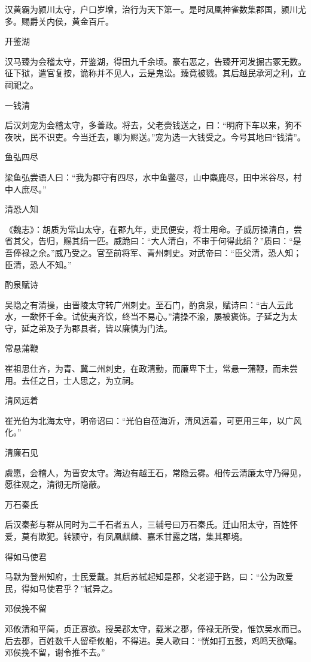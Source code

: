 \documentclass[a4paper,12pt,UTF8,twoside]{ctexbook}
\begin{document}
    汉黄霸为颍川太守，户口岁增，治行为天下第一。是时凤凰神雀数集郡国，颍川尤多。赐爵关内侯，黄金百斤。
    
    开鉴湖
    
    汉马臻为会稽太守，开鉴湖，得田九千余顷。豪右恶之，告臻开河发掘古冢无数。征下狱，遣官复按，诡称并不见人，云是鬼讼。臻竟被戮。其后越民承河之利，立祠祀之。
    
    一钱清
    
    后汉刘宠为会稽太守，多善政。将去，父老赍钱送之，曰：“明府下车以来，狗不夜吠，民不识吏。今当迁去，聊为赆送。”宠为选一大钱受之。今号其地曰“钱清”。
    
    鱼弘四尽
    
    梁鱼弘尝语人曰：“我为郡守有四尽，水中鱼鳖尽，山中麋鹿尽，田中米谷尽，村中人庶尽。”
    
    清恐人知
    
    《魏志》：胡质为常山太守，在郡九年，吏民便安，将士用命。子威厉操清白，尝省其父，告归，赐其绢一匹。威跪曰：“大人清白，不审于何得此绢？”质曰：“是吾俸禄之余。”威乃受之。官至前将军、青州刺史。对武帝曰：“臣父清，恐人知；臣清，恐人不知。”
    
    酌泉赋诗
    
    吴隐之有清操，由晋陵太守转广州刺史。至石门，酌贪泉，赋诗曰：“古人云此水，一歃怀千金。试使夷齐饮，终当不易心。”清操不渝，屡被褒饰。子延之为太守，延之弟及子为郡县者，皆以廉慎为门法。
    
    常悬蒲鞭
    
    崔祖思仕齐，为青、冀二州刺史，在政清勤，而廉卑下士，常悬一蒲鞭，而未尝用。去任之日，士人思之，为立祠。
    
    清风远着
    
    崔光伯为北海太守，明帝诏曰：“光伯自莅海沂，清风远着，可更用三年，以广风化。”
    
    清廉石见
    
    虞愿，会稽人，为晋安太守。海边有越王石，常隐云雾。相传云清廉太守乃得见，愿往观之，清彻无所隐蔽。
    
    万石秦氏
    
    后汉秦彭与群从同时为二千石者五人，三辅号曰万石秦氏。迁山阳太守，百姓怀爱，莫有欺犯。转颍守，有凤凰麒麟、嘉禾甘露之瑞，集其郡境。
    
    得如马使君
    
    马默为登州知府，士民爱戴。其后苏轼起知是郡，父老迎于路，曰：“公为政爱民，得如马使君乎？”轼异之。
    
    邓侯挽不留
    
    邓攸清和平简，贞正寡欲。授吴郡太守，载米之郡，俸禄无所受，惟饮吴水而已。后去郡，百姓数千人留牵攸船，不得进。吴人歌曰：“恍如打五鼓，鸡鸣天欲曙。邓侯挽不留，谢令推不去。”
    
\end{document}
